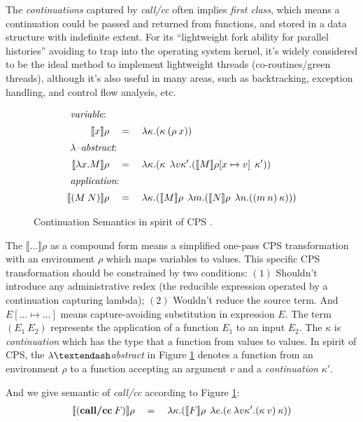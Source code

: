 \documentclass[numbers,numberedpars]{sigplanconf}
\begin{document}
The {\it continuations} captured by {\it call/cc} often implies {\it first class}, which means a continuation
could be passed and returned from functions, and stored in a data structure with indefinite extent.
For its ``lightweight fork ability for parallel histories'' avoiding to trap into the operating system kernel, it's widely considered
to be the ideal method to implement lightweight threads (co-routines/green threads), although it's also useful in many areas, such as
backtracking, exception handling, and control flow analysis, etc.


\begin{figure}[tbph]
  \raggedright
  \begin{align*}
    \shortintertext{ {\it variable}: }
    \llbracket{x}\rrbracket\rho \quad&=\quad \lambda{\kappa}.(\kappa \: (\rho \: x))
    \\
    \shortintertext{ {\it $\lambda$\textendash abstract}: }
    \llbracket{\lambda{x}.M}\rrbracket\rho \quad&=\quad
    \lambda{\kappa}.(\kappa\:\:\lambda{v\kappa'}.(\llbracket{M}\rrbracket\rho[x \mapsto v]\:\:\kappa'))
    \\
    \shortintertext{ {\it application}: }
    \llbracket{(M\:N)}\rrbracket\rho \quad&=\quad
    \lambda{\kappa}.(\llbracket{M}\rrbracket\rho\:\:\lambda{m}.(\llbracket{N}\rrbracket\rho\:\:\lambda{n}.((m\:n)\:\kappa)))
  \end{align*}
  \caption{Continuation Semantics in spirit of CPS
    \citep{Danvy92representingcontrol:}\citep{Gasbichler:2002:FSC:581478.581504}.}
    \label{fig:cont_sema}
\end{figure}

The $\llbracket{...}\rrbracket\rho$ as a compound form means a simplified one-pass CPS transformation with an environment $\rho$
which maps variables to values. This specific CPS transformation should be constrained by two conditions:
$(1)$ Shouldn't introduce any administrative redex (the reducible expression operated by a continuation capturing lambda);
$(2)$ Wouldn't reduce the source term. And $E[...\mapsto...]$ means capture-avoiding substitution in expression $E$.
The term $(E_1\:E_2)$ represents the application of a function $E_1$ to an input $E_2$. The $\kappa$
is {\it continuation} which has the type that a function from values to values. In spirit of CPS,
the $\lambda\textendash${\it abstract} in Figure \ref{fig:cont_sema} denotes a function from an environment $\rho$ to a function
accepting an argument $v$ and a {\it continuation} $\kappa'$.

And we give semantic of {\it call/cc} according to Figure \ref{fig:cont_sema}:
\begin{align*}
  \llbracket{(\text{{\bf call/cc}}\:F)}\rrbracket\rho \quad=\quad
  \lambda{\kappa}.(\llbracket{F}\rrbracket\rho\:\: \lambda{e}.(e\: \lambda{v\kappa'}.(\kappa\:v)\: \kappa))
\end{align*}
\end{document}
